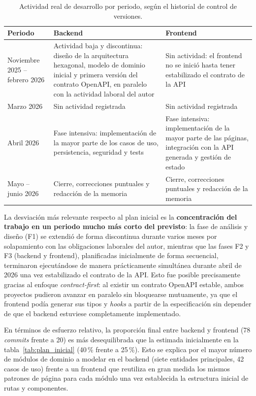 \begin{table}[ht]
\centering
\begin{tabularx}{\textwidth}{lXX}
\hline
\textbf{Periodo} & \textbf{Backend} & \textbf{Frontend} \\
\hline
Noviembre 2025 -- febrero 2026 &
  Actividad baja y discontinua: diseño de la arquitectura hexagonal, modelo de
  dominio inicial y primera versión del contrato OpenAPI, en paralelo con
  la actividad laboral del autor &
  Sin actividad: el frontend no se inició hasta tener estabilizado el
  contrato de la API \\
Marzo 2026 &
  Sin actividad registrada &
  Sin actividad registrada \\
Abril 2026 &
  Fase intensiva: implementación de la mayor parte de los casos de uso,
  persistencia, seguridad y tests &
  Fase intensiva: implementación de la mayor parte de las páginas, integración
  con la API generada y gestión de estado \\
Mayo -- junio 2026 &
  Cierre, correcciones puntuales y redacción de la memoria &
  Cierre, correcciones puntuales y redacción de la memoria \\
\hline
\end{tabularx}
\caption{Actividad real de desarrollo por periodo, según el historial de
  control de versiones.}
\label{tab:ejecucion_real}
\end{table}

La desviación más relevante respecto al plan inicial es la \textbf{concentración
del trabajo en un periodo mucho más corto del previsto}: la fase de análisis y
diseño (F1) se extendió de forma discontinua durante varios meses por
solapamiento con las obligaciones laborales del autor, mientras que las
fases F2 y F3 (backend y frontend), planificadas inicialmente de forma
secuencial, terminaron ejecutándose de manera prácticamente simultánea durante
abril de 2026 una vez estabilizado el contrato de la API. Esto fue posible
precisamente gracias al enfoque \textit{contract-first}: al existir un contrato
OpenAPI estable, ambos proyectos pudieron avanzar en paralelo sin bloquearse
mutuamente, ya que el frontend podía generar sus tipos y \textit{hooks} a partir
de la especificación sin depender de que el backend estuviese completamente
implementado.

En términos de esfuerzo relativo, la proporción final entre backend y frontend
(78 \textit{commits} frente a 20) es más desequilibrada que la estimada
inicialmente en la tabla~\ref{tab:plan_inicial} (40\,\% frente a 25\,\%). Esto
se explica por el mayor número de módulos de dominio a modelar en el backend
(siete entidades principales, 42 casos de uso) frente a un frontend que reutiliza
en gran medida los mismos patrones de página para cada módulo una vez establecida
la estructura inicial de rutas y componentes.

